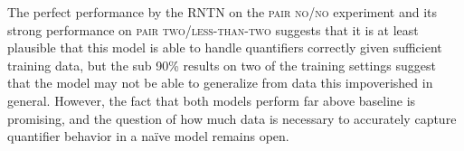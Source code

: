 The perfect performance by the RNTN on the
\textsc{pair no/no} experiment and its strong performance on
\textsc{pair two/less-than-two} suggests that it is at least plausible
that this model is able to handle quantifiers correctly given
sufficient training data, but the sub 90\% results on two of the
training settings suggest that the model may not be able to
generalize from data this impoverished in general. However, the fact
that both models perform far above baseline is promising, and the
question of how much data is necessary to accurately capture
quantifier behavior in a na\"ive model remains open.

